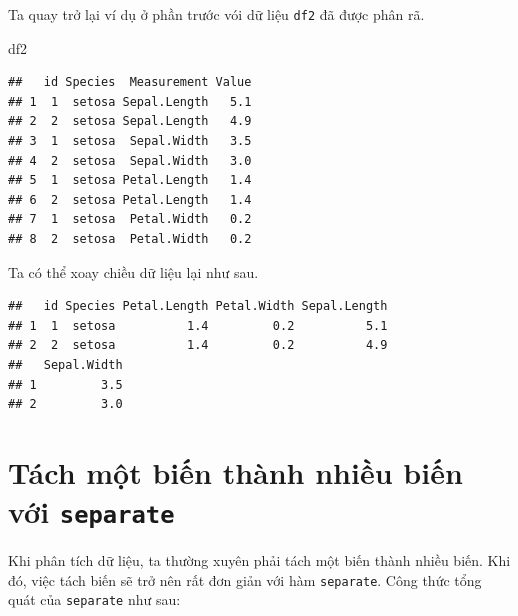 \documentclass[]{krantz}
\makeatletter
\newenvironment{Shaded}{\begin{snugshade}}{\end{snugshade}}
\newcommand{\DataTypeTok}[1]{\textcolor[rgb]{0.27,0.27,0.27}{#1}}
\newcommand{\KeywordTok}[1]{\textcolor[rgb]{0.27,0.27,0.27}{\textbf{#1}}}
\newcommand{\NormalTok}[1]{#1}
\newcommand{\OperatorTok}[1]{\textcolor[rgb]{0.43,0.43,0.43}{\textbf{#1}}}
\newcommand{\StringTok}[1]{\textcolor[rgb]{0.5,0.5,0.5}{#1}}
\newenvironment{kframe}{%
\medskip{}
\setlength{\fboxsep}{.8em}
 \def\at@end@of@kframe{}%
 \ifinner\ifhmode%
  \def\at@end@of@kframe{\end{minipage}}%
  \begin{minipage}{\columnwidth}%
 \fi\fi%
 \def\FrameCommand##1{\hskip\@totalleftmargin \hskip-\fboxsep
 \colorbox{shadecolor}{##1}\hskip-\fboxsep
     \hskip-\linewidth \hskip-\@totalleftmargin \hskip\columnwidth}%
 \MakeFramed {\advance\hsize-\width
   \@totalleftmargin\z@ \linewidth\hsize
   \@setminipage}}%
 {\par\unskip\endMakeFramed%
 \at@end@of@kframe}
\renewenvironment{Shaded}{\begin{kframe}}{\end{kframe}}
\renewenvironment{Shaded}{\begin{snugshade}}{\end{snugshade}}
\renewcommand{\DataTypeTok}[1]{\textcolor[rgb]{0.13,0.29,0.53}{#1}}
\renewcommand{\KeywordTok}[1]{\textcolor[rgb]{0.13,0.29,0.53}{\textbf{#1}}}
\renewcommand{\NormalTok}[1]{#1}
\renewcommand{\OperatorTok}[1]{\textcolor[rgb]{0.81,0.36,0.00}{\textbf{#1}}}
\renewcommand{\StringTok}[1]{\textcolor[rgb]{0.31,0.60,0.02}{#1}}
\theoremstyle{definition}
\theoremstyle{definition}
\theoremstyle{definition}
\theoremstyle{remark}
\makeatother
\begin{document}
Ta quay trở lại ví dụ ở phần trước vói dữ liệu \texttt{df2} đã được phân
rã.

\begin{Shaded}
\begin{Highlighting}[]
\NormalTok{df2}
\end{Highlighting}
\end{Shaded}

\begin{verbatim}
##   id Species  Measurement Value
## 1  1  setosa Sepal.Length   5.1
## 2  2  setosa Sepal.Length   4.9
## 3  1  setosa  Sepal.Width   3.5
## 4  2  setosa  Sepal.Width   3.0
## 5  1  setosa Petal.Length   1.4
## 6  2  setosa Petal.Length   1.4
## 7  1  setosa  Petal.Width   0.2
## 8  2  setosa  Petal.Width   0.2
\end{verbatim}

Ta có thể xoay chiều dữ liệu lại như sau.

\begin{Shaded}
\end{Shaded}

\begin{verbatim}
##   id Species Petal.Length Petal.Width Sepal.Length
## 1  1  setosa          1.4         0.2          5.1
## 2  2  setosa          1.4         0.2          4.9
##   Sepal.Width
## 1         3.5
## 2         3.0
\end{verbatim}

\hypertarget{tach-mt-bin-thanh-nhiu-bin-vi-separate}{%
\section{\texorpdfstring{Tách một biến thành nhiều biến với
\texttt{separate}}{Tách một biến thành nhiều biến với separate}}\label{tach-mt-bin-thanh-nhiu-bin-vi-separate}}

Khi phân tích dữ liệu, ta thường xuyên phải tách một biến thành nhiều
biến. Khi đó, việc tách biến sẽ trở nên rất đơn giản với hàm
\texttt{separate}. Công thức tổng quát của \texttt{separate} như sau:

\begin{Shaded}
\end{Shaded}
\end{document}
